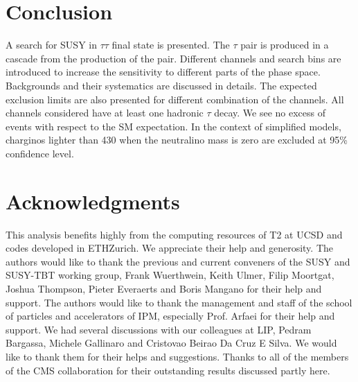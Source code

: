 \section{Conclusion}
\label{sect:conclusion}
A search for SUSY in $\tau\tau$ final state is presented. The $\tau$ pair is produced in a cascade from the production of the \PSGcpDo pair.
Different channels and search bins are introduced to increase the sensitivity to different parts of the phase space. 
Backgrounds and their systematics are discussed in details. The expected exclusion limits are also presented for different combination of the 
channels.
All channels considered have at least one hadronic $\tau$ decay.
We see no excess of events with respect to the SM expectation.
In the context of simplified models, charginos lighter than 430 \GeV when the neutralino mass is zero
are excluded at 95\% confidence level.

\section{Acknowledgments}
This analysis benefits highly from the computing resources of T2 at UCSD and codes developed in ETHZurich. 
We appreciate their help and generosity.
The authors would like to thank the previous and current conveners of the SUSY and SUSY-TBT working group, Frank Wuerthwein, Keith Ulmer, Filip Moortgat, Joshua Thompson, Pieter Everaerts and Boris Mangano for their help and support. 
The authors would like to thank the management and staff of the school of particles 
and accelerators of IPM, especially Prof. Arfaei for their help and support. 
We had several discussions with our colleagues at LIP, Pedram Bargassa, Michele Gallinaro and Cristovao Beirao Da Cruz E Silva. 
We would like to thank them for their helps and suggestions.
Thanks to all of the members of
the CMS collaboration for their outstanding results discussed partly here.
